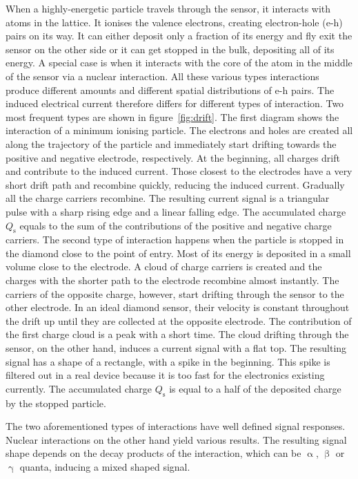 When a highly-energetic particle travels through the sensor, it interacts with atoms in the lattice. It ionises the valence electrons, creating electron-hole (e-h) pairs on its way. It can either deposit only a fraction of its energy and fly exit the sensor on the other side or it can get stopped in the bulk, depositing all of its energy. A special case is when it interacts with the core of the atom in the middle of the sensor via a nuclear interaction. All these various types interactions produce different amounts and different spatial distributions of e-h pairs. The induced electrical current therefore differs for different types of interaction. Two most frequent types are shown in figure~\ref{fig:drift}. The first diagram shows the interaction of a minimum ionising particle. The electrons and holes are created all along the trajectory of the particle and immediately start drifting towards the positive and negative electrode, respectively. At the beginning, all charges drift and contribute to the induced current. Those closest to the electrodes have a very short drift path and recombine quickly, reducing the induced current. Gradually all the charge carriers recombine. The resulting current signal is a triangular pulse with a sharp rising edge and a linear falling edge. The accumulated charge $Q_\mathrm{s}$ equals to the sum of the contributions of the positive and negative charge carriers. The second type of interaction happens when the particle is stopped in the diamond close to the point of entry. Most of its energy is deposited in a small volume close to the electrode. A cloud of charge carriers is created and the charges with the shorter path to the electrode recombine almost instantly. The carriers of the opposite charge, however, start drifting through the sensor to the other electrode. In an ideal diamond sensor, their velocity is constant throughout the drift up until they are collected at the opposite electrode. The contribution of the first charge cloud is a peak with a short time. The cloud drifting through the sensor, on the other hand, induces a current signal with a flat top. The resulting signal has a shape of a rectangle, with a spike in the beginning. This spike is filtered out in a real device because it is too fast for the electronics existing currently. The accumulated charge $Q_\mathrm{s}$ is equal to a half of the deposited charge by the stopped particle.

The two aforementioned types of interactions have well defined signal responses. Nuclear interactions on the other hand yield various results. The resulting signal shape depends on the decay products of the interaction, which can be $\upalpha$, $\upbeta$ or $\upgamma$ quanta, inducing a mixed shaped signal. 
%


